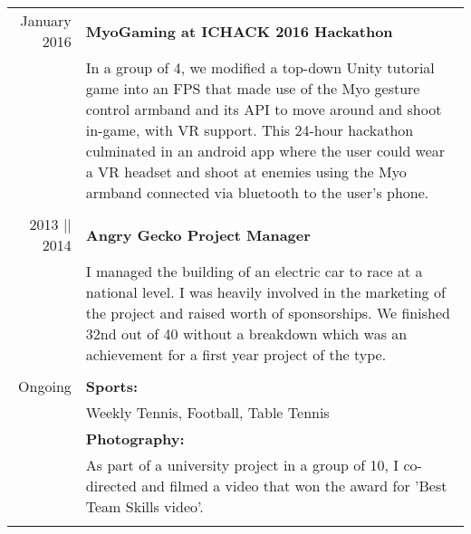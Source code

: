 \documentclass[a4paper,10pt]{article}
\begin{document}
	\begin{tabular}{r|p{12cm}}
		January 2016 & \textbf{MyoGaming at ICHACK 2016 Hackathon} \\&In a group of 4, we modified a top-down Unity tutorial game into an FPS that made use of the Myo gesture control armband and its API to move around and shoot in-game, with VR support.
		This 24-hour hackathon culminated in an android app where the user could wear a VR headset and shoot at enemies using the Myo armband connected via bluetooth to the user's phone.
		\\\multicolumn{2}{c}{} \\
		
		2013 || 2014 & \textbf{Angry Gecko Project Manager} \\& I managed the building of an electric car to race at a national level. I was heavily involved in the marketing 		of the project and raised \textsterling700 worth of sponsorships. We finished 32nd out of 40 without a breakdown which was an achievement for a first year project of the type. 
		\\\multicolumn{2}{c}{} \\
		
		Ongoing & \textbf{Sports:} \\& Weekly Tennis, Football, Table Tennis \\& \textbf{Photography:} \\& As part of a university project in a group of 10, I co-directed and filmed a video that won the award for 'Best Team Skills video'.
		\\\multicolumn{2}{c}{} \\
		
	\end{tabular}
	
	
	
	
\end{document}

